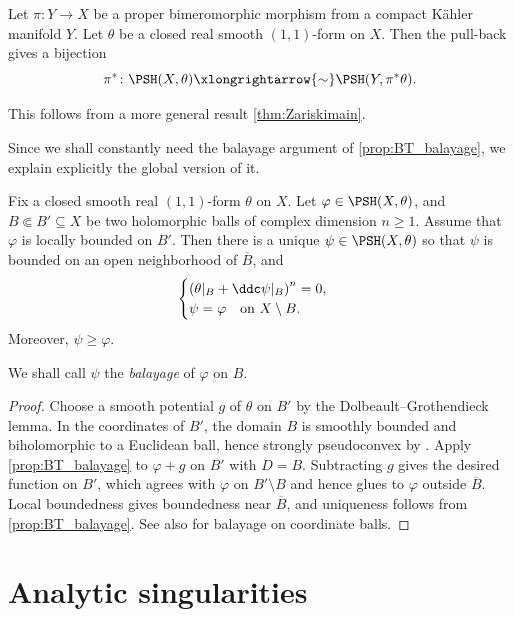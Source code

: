 \begin{proposition}\label{prop:PSHpullbij}
    Let $\pi\colon Y\rightarrow X$ be a proper bimeromorphic morphism from a compact Kähler manifold $Y$. Let $\theta$ be a closed real smooth $(1,1)$-form on $X$. Then the pull-back gives a bijection
    \[
    \pi^*\colon \PSH(X,\theta)\xlongrightarrow{\sim}\PSH(Y,\pi^*\theta).
    \]
\end{proposition}
This follows from a more general result \cref{thm:Zariskimain}.


Since we shall constantly need the balayage argument of \cref{prop:BT_balayage}, we explain explicitly the global version of it.


\begin{proposition}\label{prop:bal_general}
    Fix a closed smooth real $(1,1)$-form $\theta$ on $X$.
    Let $\varphi\in \PSH(X,\theta)$, and $B\Subset B' \subseteq X$ be two holomorphic balls of complex dimension $n\geq 1$. Assume that $\varphi$ is locally bounded on $B'$. Then there is a unique $\psi \in \PSH(X,\theta)$ so that $\psi$ is bounded on an open neighborhood of $\overline{B}$, and
    \[
    \begin{cases}
        \left( \theta|_B+\ddc \psi|_B \right)^n = 0,\\
        \psi = \varphi \quad \textup{on } X\setminus B.
    \end{cases}
    \]
    Moreover, $\psi\geq \varphi$.
\end{proposition}
We shall call $\psi$ the \emph{balayage} of $\varphi$ on $B$.
\begin{proof}
    Choose a smooth potential $g$ of $\theta$ on $B'$ by the Dolbeault--Grothendieck lemma. In the coordinates of $B'$, the domain $B$ is smoothly bounded and biholomorphic to a Euclidean ball, hence strongly pseudoconvex by \cite{Bell81}. Apply \cref{prop:BT_balayage} to $\varphi+g$ on $B'$ with $D=B$. Subtracting $g$ gives the desired function on $B'$, which agrees with $\varphi$ on $B'\setminus B$ and hence glues to $\varphi$ outside $\overline B$. Local boundedness gives boundedness near $\overline B$, and uniqueness follows from \cref{prop:BT_balayage}. See also \cite[Corollary~14.2.9]{FPT} for balayage on coordinate balls.
\end{proof}






\section{Analytic singularities}\label{sec:anasing}

